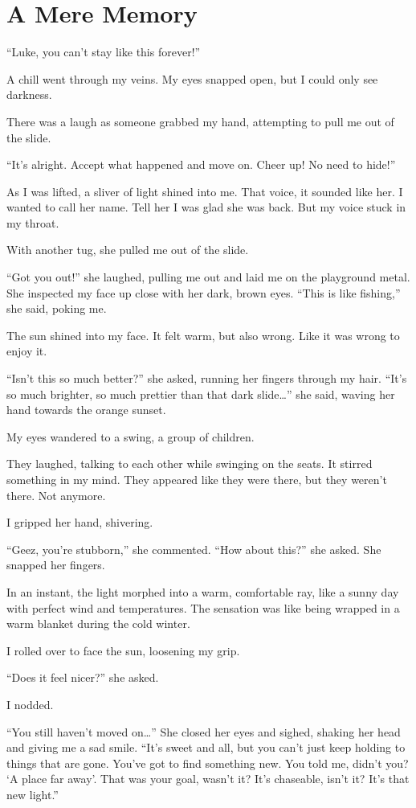 \section{A Mere Memory}
“Luke, you can't stay like this forever!”

A chill went through my veins. My eyes snapped open, but I could only see darkness.

There was a laugh as someone grabbed my hand, attempting to pull me out of the slide.

“It's alright. Accept what happened and move on. Cheer up! No need to hide!”

As I was lifted, a sliver of light shined into me. That voice, it sounded like her. I wanted to call her name. Tell her I was glad she was back. But my voice stuck in my throat.

With another tug, she pulled me out of the slide.

“Got you out!” she laughed, pulling me out and laid me on the playground metal. She inspected my face up close with her dark, brown eyes. “This is like fishing,” she said, poking me.

The sun shined into my face. It felt warm, but also wrong. Like it was wrong to enjoy it.

“Isn't this so much better?” she asked, running her fingers through my hair. “It's so much brighter, so much prettier than that dark slide…” she said, waving her hand towards the orange sunset.

My eyes wandered to a swing, a group of children.

They laughed, talking to each other while swinging on the seats. It stirred something in my mind. They appeared  like they were there, but they weren't there. Not anymore. 

I gripped her hand, shivering.

“Geez, you're stubborn,” she commented. “How about this?” she asked. She snapped her fingers. 

In an instant, the light morphed into a warm, comfortable ray, like a sunny day with perfect wind and temperatures. The sensation was like being wrapped in a warm blanket during the cold winter.

I rolled over to face the sun, loosening my grip.

“Does it feel nicer?” she asked.

I nodded.

“You still haven't moved on…” She closed her eyes and sighed, shaking her head and giving me a sad smile. “It's sweet and all, but you can't just keep holding to things that are gone. You've got to find something new. You told me, didn't you? ‘A place far away'. That was your goal, wasn't it? It's chaseable, isn't it? It's that new light.”


